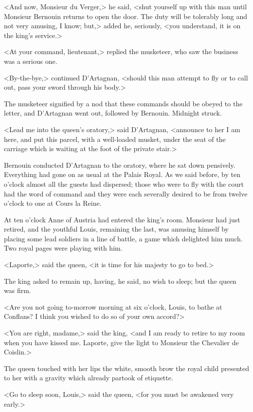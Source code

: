 <And now, Monsieur du Verger,> he said, <shut yourself up with this man until Monsieur Bernouin returns to open the door. The duty will be tolerably long and not very amusing, I know; but,> added he, seriously, <you understand, it is on the king's service.>

<At your command, lieutenant,> replied the musketeer, who saw the business was a serious one.

<By-the-bye,> continued D'Artagnan, <should this man attempt to fly or to call out, pass your sword through his body.>

The musketeer signified by a nod that these commands should be obeyed to the letter, and D'Artagnan went out, followed by Bernouin. Midnight struck.

<Lead me into the queen's oratory,> said D'Artagnan, <announce to her I am here, and put this parcel, with a well-loaded musket, under the seat of the carriage which is waiting at the foot of the private stair.>

Bernouin conducted D'Artagnan to the oratory, where he sat down pensively. Everything had gone on as usual at the Palais Royal. As we said before, by ten o'clock almost all the guests had dispersed; those who were to fly with the court had the word of command and they were each severally desired to be from twelve o'clock to one at Cours la Reine.

At ten o'clock Anne of Austria had entered the king's room. Monsieur had just retired, and the youthful Louis, remaining the last, was amusing himself by placing some lead soldiers in a line of battle, a game which delighted him much. Two royal pages were playing with him.

<Laporte,> said the queen, <it is time for his majesty to go to bed.>

The king asked to remain up, having, he said, no wish to sleep; but the queen was firm.

<Are you not going to-morrow morning at six o'clock, Louis, to bathe at Conflans? I think you wished to do so of your own accord?>

<You are right, madame,> said the king, <and I am ready to retire to my room when you have kissed me. Laporte, give the light to Monsieur the Chevalier de Coislin.>

The queen touched with her lips the white, smooth brow the royal child presented to her with a gravity which already partook of etiquette.

<Go to sleep soon, Louis,> said the queen, <for you must be awakened very early.>

